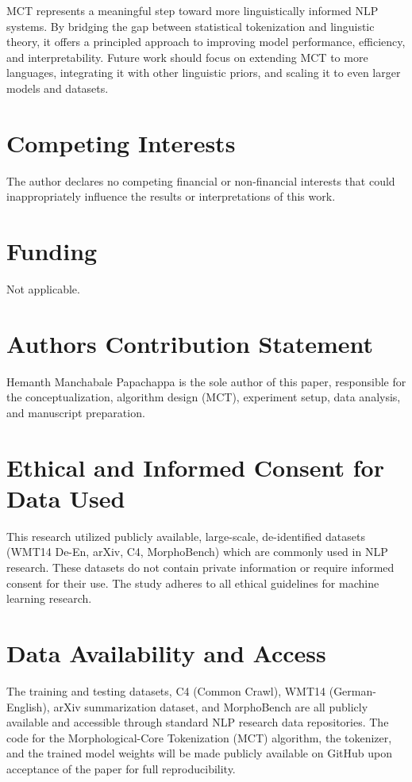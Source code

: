 \documentclass[conference]{IEEEtran}
\begin{document}
MCT represents a meaningful step toward more linguistically informed NLP systems. By bridging the gap between statistical tokenization and linguistic theory, it offers a principled approach to improving model performance, efficiency, and interpretability. Future work should focus on extending MCT to more languages, integrating it with other linguistic priors, and scaling it to even larger models and datasets.

\section*{Competing Interests}
The author declares no competing financial or non-financial interests that could inappropriately influence the results or interpretations of this work.

\section*{Funding}
Not applicable.

\section*{Authors Contribution Statement}
Hemanth Manchabale Papachappa is the sole author of this paper, responsible for the conceptualization, algorithm design (MCT), experiment setup, data analysis, and manuscript preparation.

\section*{Ethical and Informed Consent for Data Used}
This research utilized publicly available, large-scale, de-identified datasets (WMT14 De-En, arXiv, C4, MorphoBench) which are commonly used in NLP research. These datasets do not contain private information or require informed consent for their use. The study adheres to all ethical guidelines for machine learning research.

\section*{Data Availability and Access}
The training and testing datasets, C4 (Common Crawl), WMT14 (German-English), arXiv summarization dataset, and MorphoBench are all publicly available and accessible through standard NLP research data repositories. The code for the Morphological-Core Tokenization (MCT) algorithm, the tokenizer, and the trained model weights will be made publicly available on GitHub upon acceptance of the paper for full reproducibility.
\end{document}
